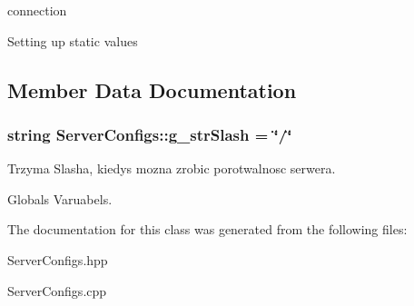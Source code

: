connection

Setting up static values 



\subsection{Member Data Documentation}
\hypertarget{classServerConfigs_ac2063e674b25db88fdea31ced792937e}{
\subsubsection[{g\_\-strSlash}]{\setlength{\rightskip}{0pt plus 5cm}string {\bf ServerConfigs::g\_\-strSlash} = \char`\"{}/\char`\"{}}}
\label{classServerConfigs_ac2063e674b25db88fdea31ced792937e}


Trzyma Slasha, kiedys mozna zrobic porotwalnosc serwera. 

Globals Varuabels. 

The documentation for this class was generated from the following files:\begin{DoxyCompactItemize}
\item 
ServerConfigs.hpp\item 
ServerConfigs.cpp\end{DoxyCompactItemize}
